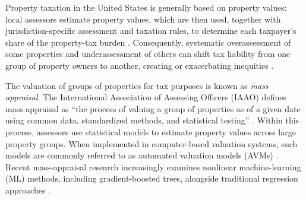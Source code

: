 \documentclass[10pt]{article}
\theoremstyle{definition}
\newcommand{\1}{\mathbf{1}}
\begin{document}
{Property taxation in the United States is generally based on property values}: local assessors estimate property values, which are then used, together with jurisdiction-specific assessment and taxation rules, to determine each taxpayer's share of the property-tax burden \cite{IAAO2020PropertyTaxPolicy,IAAO2025Mass}. Consequently, systematic overassessment of some properties and underassessment of others can shift tax liability from one group of property owners to another, creating or exacerbating inequities \cite{Berry2021,IAAO2020PropertyTaxPolicy}.

The {valuation} of groups of properties for tax purposes is known as \emph{mass appraisal}. The International Association of Assessing Officers (IAAO) defines mass appraisal as ``the process of valuing a group of properties as of a given date using common data, standardized methods, and statistical testing'' \cite{IAAO2025Mass}. Within this process, assessors use statistical models to estimate property values across large property groups. {When implemented in computer-based valuation systems, such models are commonly referred to as automated valuation models (AVMs)} \cite{IAAOAITaskForce2022,BidansetRakow2022}. Recent mass-appraisal research increasingly examines nonlinear machine-learning (ML) methods, including gradient-boosted trees, alongside traditional regression approaches \cite{Rootetal2023,Sevgen2024100111,Zilli2024}. %
\end{document}
